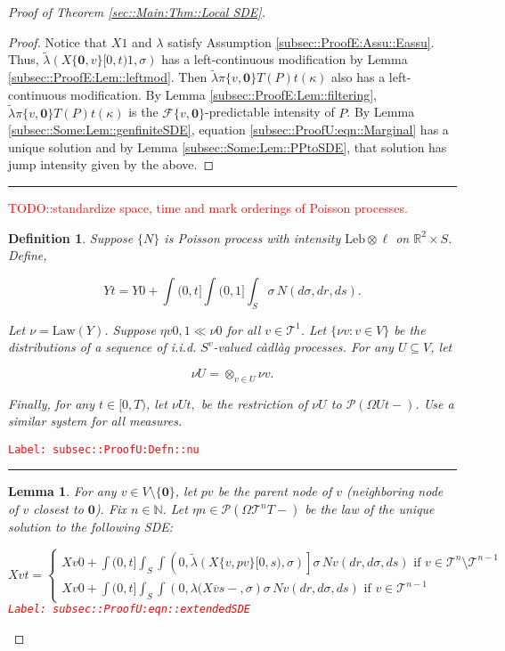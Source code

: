\documentclass[12pt]{article}
\newcommand{\mb}{\mathbb}
\newcommand{\mc}{\mathcal}
\newcommand{\ov}{\overline}
\newcommand{\te}{\text}
\newcommand{\tr}{\textcolor{red}}
\newcommand{\labe}[1]{\tr{\texttt{Label: #1}}}
\newcommand{\lin}{\rule{\linewidth}{0.4 pt}}
\newcommand{\pmsr}{\mc{P}}							%
\renewcommand{\root}{\mathbf{0}}				%
\renewcommand{\v}{v}							%
\renewcommand{\U}{U}							%
\renewcommand{\S}{S}							%
\newcommand{\s}{\sigma}							%
\newcommand{\T}{T}								%
\renewcommand{\t}{t}							%
\newcommand{\proj}{\pi}							%
\renewcommand{\tt}{s}							%
\newcommand{\F}{\mc{F}}							%
\newcommand{\X}{X}								%
\newcommand{\carp}[1]{^{#1}}					%
\newcommand{\cl}{\ov}							%
\newcommand{\tree}{\mc{T}}						%
\newcommand{\sln}[1]{^{#1}}						%
\newcommand{\poiss}{N}							%
\newcommand{\leb}{\te{Leb}}						%
\newcommand{\Sm}{\ell}							%
\newcommand{\rate}{\lambda}						%
\renewcommand{\r}{r}							%
\newcommand{\alt}[1]{\widetilde{#1}}			%
\newcommand{\mm}{\nu}							%
\newcommand{\mmm}{\eta}							%
\newcommand{\law}{\te{Law}}						%
\newcommand{\XX}{Y}								%
\renewcommand{\mark}{\kappa}					%
\newcommand{\rp}{P}								%
\newcommand{\crate}{\alt{\lambda}}				%
\newcommand{\p}{p}								%
\newtheorem{lem}[thms]{Lemma}
\newtheorem{defn}[thms]{Definition}
\begin{document}
\begin{proof}[Proof of Theorem \ref{sec::Main:Thm::Local SDE}]
\begin{proof}
Notice that \(\X{}{}{1}\) and \(\rate{}\) satisfy Assumption \ref{subsec::ProofE:Assu::Eassu}. Thus, \(\crate{}{}(\X{\{\root,\v\}}{[0,\t)}{1},\s)\) has a left-continuous modification by Lemma \ref{subsec::ProofE:Lem::leftmod}. Then \(\crate{\proj{\{\v,\root\}}{\T}(\rp{})}{\t}(\mark{})\) also has a left-continuous modification. By Lemma \ref{subsec::ProofE:Lem::filtering}, \(\crate{\proj{\{\v,\root\}}{\T}(\rp{})}{\t}(\kappa)\) is the \(\F{\{\v,\root\}}{}\)-predictable intensity of \(\rp{}\). By Lemma \ref{subsec::Some:Lem::genfiniteSDE}, equation \eqref{subsec::ProofU:eqn::Marginal} has a unique solution and by Lemma \ref{subsec::Some:Lem::PPtoSDE}, that solution has jump intensity given by the above.

\end{proof}

\lin

\tr{TODO::standardize space, time and mark orderings of Poisson processes.}

\begin{defn}
Suppose \(\{\poiss{}\}\) is Poisson process with intensity \(\leb\otimes \Sm\) on \(\mb{R}^2\times \S\). Define,

\[\XX{}{\t} = \XX{}{0} + \int{(0,\t]}\int{(0,1]}\int_\S\s\,\poiss{}(d\s,d\r,d\tt).\]

Let \(\mm{}{}{} = \law(\XX{}{})\). Suppose \(\mmm{\v}{0,}{1}\ll\mm{}{0}{}\) for all \(\v\in\tree\sln{1}\). Let \(\{\mm{\v}{}{}:\v\in V\}\) be the distributions of a sequence of i.i.d. \(\S\carp{\v}\)-valued c\`adl\`ag processes. For any \(\U\subseteq V\), let 

\[\mm{\U}{}{} = \otimes_{\v\in\U} \mm{\v}{}{}.\]

Finally, for any \(\t\in [0,\T)\), let \(\mm{\U}{\t,}{}\) be the restriction of \(\mm{\U}{}{}\) to \(\pmsr(\Omega{\U}{\t-})\). Use a similar system for all measures.
\label{subsec::ProofU:Defn::nu}
\end{defn}
\labe{subsec::ProofU:Defn::nu}

\lin

\begin{lem}
For any \(\v \in V\setminus\{\root\}\), let \(\p{\v}\) be the parent node of \(\v\) (neighboring node of \(\v\) closest to \(\root\)). Fix \(n \in \mb{N}\). Let \(\mmm{}{}{n} \in \pmsr\left(\Omega{\tree\sln{n}}{\T-}\right)\) be the law of the unique solution to the following SDE:

\begin{equation}
\X{\v}{\t} = \begin{cases}
\X{\v}{0} + \int{(0,\t]}\int_\S\int{\left(0,\crate{}{}(\X{\{\v,\p{\v}\}}{[0,\tt)},\s)\right]}\s\,\poiss{\v}(d\r,d\s,d\tt)\te{ if } \v \in \tree\sln{n}\setminus \tree\sln{n-1}\\
\X{\v}{0} + \int{(0,\t]}\int_\S\int{\left(0,\rate{}(\X{\cl{\v}}{\tt-},\s\right)}\s\,\poiss{\v}(d\r,d\s,d\tt)\te{ if } \v \in \tree\sln{n-1}
\end{cases}
\label{subsec::ProofU:eqn::extendedSDE}
\end{equation}
\labe{subsec::ProofU:eqn::extendedSDE}


\end{lem}
\end{proof}
\end{document}

